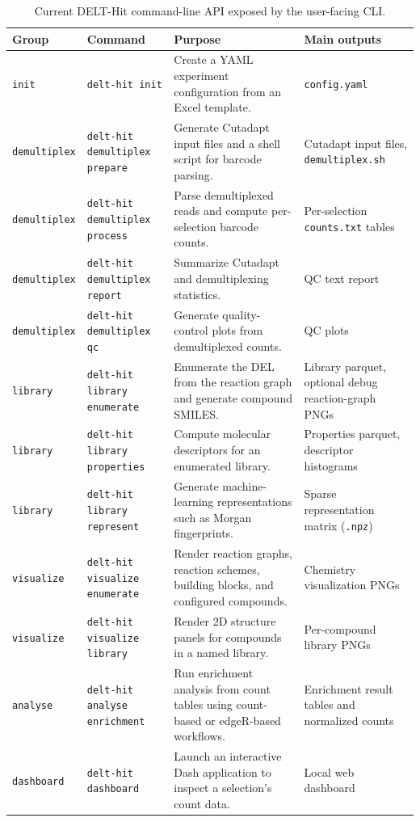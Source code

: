\begin{table}
\centering
\small
\caption{Current DELT-Hit command-line API exposed by the user-facing CLI.}
\begin{tabular*}{\textheight}{@{\extracolsep\fill}p{2.2cm}p{2.8cm}p{6.4cm}p{3.8cm}}
\hline
\textbf{Group} & \textbf{Command} & \textbf{Purpose} & \textbf{Main outputs} \\
\hline
\texttt{init} & \texttt{delt-hit init} & Create a YAML experiment configuration from an Excel template. & \texttt{config.yaml} \\
\texttt{demultiplex} & \texttt{delt-hit demultiplex prepare} & Generate Cutadapt input files and a shell script for barcode parsing. & Cutadapt input files, \texttt{demultiplex.sh} \\
\texttt{demultiplex} & \texttt{delt-hit demultiplex process} & Parse demultiplexed reads and compute per-selection barcode counts. & Per-selection \texttt{counts.txt} tables \\
\texttt{demultiplex} & \texttt{delt-hit demultiplex report} & Summarize Cutadapt and demultiplexing statistics. & QC text report \\
\texttt{demultiplex} & \texttt{delt-hit demultiplex qc} & Generate quality-control plots from demultiplexed counts. & QC plots \\
\texttt{library} & \texttt{delt-hit library enumerate} & Enumerate the DEL from the reaction graph and generate compound SMILES. & Library parquet, optional debug reaction-graph PNGs \\
\texttt{library} & \texttt{delt-hit library properties} & Compute molecular descriptors for an enumerated library. & Properties parquet, descriptor histograms \\
\texttt{library} & \texttt{delt-hit library represent} & Generate machine-learning representations such as Morgan fingerprints. & Sparse representation matrix (\texttt{.npz}) \\
\texttt{visualize} & \texttt{delt-hit visualize enumerate} & Render reaction graphs, reaction schemes, building blocks, and configured compounds. & Chemistry visualization PNGs \\
\texttt{visualize} & \texttt{delt-hit visualize library} & Render 2D structure panels for compounds in a named library. & Per-compound library PNGs \\
\texttt{analyse} & \texttt{delt-hit analyse enrichment} & Run enrichment analysis from count tables using count-based or edgeR-based workflows. & Enrichment result tables and normalized counts \\
\texttt{dashboard} & \texttt{delt-hit dashboard} & Launch an interactive Dash application to inspect a selection's count data. & Local web dashboard \\
\hline
\end{tabular*}
\label{tab:delt-hit-api}
\end{table}
